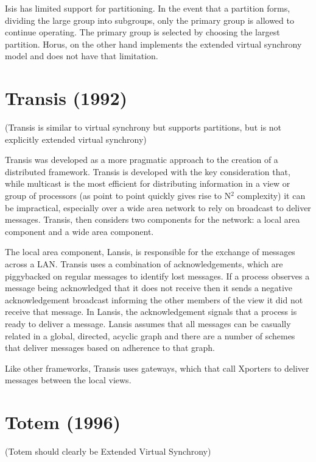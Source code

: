 Isis has limited support for partitioning. In the event that
a partition forms, dividing the large group into subgroups, only the primary
group is allowed to continue operating. The primary group is selected by
choosing the largest partition. Horus, on the other hand implements the extended
virtual synchrony model and does not have that limitation.

\section{Transis (1992)}

(Transis is similar to virtual synchrony but supports partitions, but is not explicitly extended virtual synchrony)

Transis \cite{TRANSISTOOLKIT} was developed as a more pragmatic approach to the creation of a distributed
framework. Transis is developed with the key consideration that, while multicast is
the most efficient for distributing information in a view or group of processors (as
point to point quickly gives rise to N$^{2}$ complexity) it can be impractical, especially
over a wide area network to rely on broadcast to deliver messages. Transis, then
considers two components for the network: a local area component and a wide area 
component.

The local area component, Lansis, is responsible for the exchange of messages across a
LAN. Transis uses a combination of acknowledgements, which are piggybacked on regular
messages to identify lost messages. If a process observes a message being acknowledged
that it does not receive then it sends a negative acknowledgement broadcast informing
the other members of the view it did not receive that message. In Lansis, the 
acknowledgement signals that a process is ready to deliver a message. Lansis assumes
that all messages can be casually related in a global, directed, acyclic graph and
there are a number of schemes that deliver messages based on adherence to that graph.

Like other frameworks, Transis uses gateways, which that call Xporters to deliver
messages between the local views. 

\section{Totem (1996)}

(Totem should clearly be Extended Virtual Synchrony)

